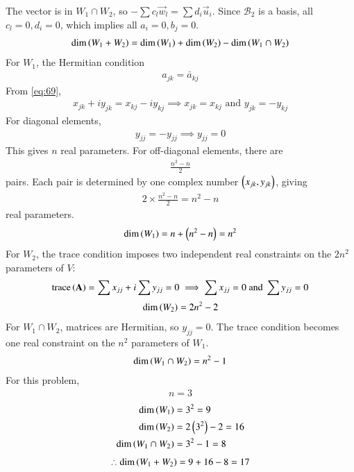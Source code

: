 \documentclass[journal]{IEEEtran}
\begin{document}
The vector is in $W_1 \cap W_2$, so $-\sum c_l \vec{w}_l = \sum d_i \vec{u}_i$. Since $\mathcal{B}_2$ is a basis, all $c_l=0, d_i=0$, which implies all $a_i=0, b_j=0$.
\begin{align}
    \dim\left(W_1 + W_2\right) = \dim\left(W_1\right) + \dim\left(W_2\right) - \dim\left(W_1 \cap W_2\right)
\end{align}
For $W_1$, the Hermitian condition 
\begin{align}
    a_{jk} = \bar{a}_{kj} \label{eq:69}
\end{align}
From \eqref{eq:69},
\begin{align}
    x_{jk} + iy_{jk} = x_{kj} - iy_{kj} \implies x_{jk}=x_{kj} \text{ and } y_{jk}=-y_{kj}
\end{align}
For diagonal elements, 
\begin{align}
y_{jj} = -y_{jj} \implies y_{jj} = 0
\end{align}
This gives $n$ real parameters.
For off-diagonal elements, there are 
\begin{align}
    \frac{n^2-n}{2}
\end{align}
pairs. Each pair is determined by one complex number $\begin{pmatrix}x_{jk}, y_{jk}\end{pmatrix}$, giving 
\begin{align}
    2 \times \frac{n^2-n}{2} = n^2-n
\end{align}
real parameters.
\begin{align}
    \dim\left(W_1\right) = n + \left(n^2-n\right) = n^2
\end{align}
For $W_2$, the trace condition imposes two independent real constraints on the $2n^2$ parameters of $V$:
\begin{align}
    \text{trace}\left(\mathbf{A}\right) = \sum x_{jj} + i \sum y_{jj} = 0 \implies \sum x_{jj} = 0 \text{ and } \sum y_{jj} = 0
\end{align}
\begin{align}
    \dim\left(W_2\right) = 2n^2 - 2
\end{align}
For $W_1 \cap W_2$, matrices are Hermitian, so $y_{jj}=0$. The trace condition becomes one real constraint on the $n^2$ parameters of $W_1$.
\begin{align}
    \dim\left(W_1 \cap W_2\right) = n^2 - 1
\end{align}
For this problem,
\begin{align}
    n=3
\end{align}
\begin{align}
    \dim\left(W_1\right) &= 3^2 = 9 \\
    \dim\left(W_2\right) &= 2\left(3^2\right) - 2 = 16 \\
    \dim\left(W_1 \cap W_2\right) &= 3^2 - 1 = 8
\end{align}
\begin{align}
    \therefore \dim\left(W_1 + W_2\right) = 9 + 16 - 8 = 17
\end{align}
\end{document}
